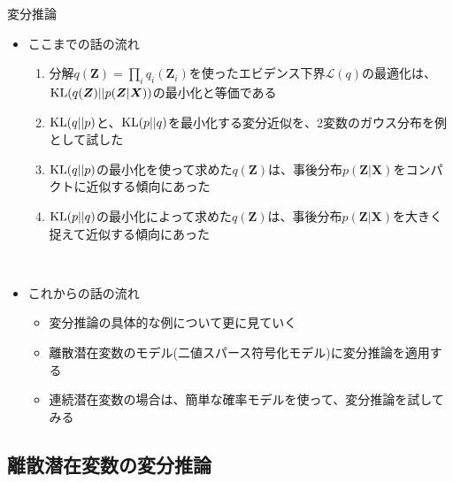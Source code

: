 \documentclass[dvipdfmx,notheorems,t]{beamer}
\begin{document}
\begin{frame}{変分推論}

\begin{itemize}
	\item ここまでの話の流れ
	\begin{enumerate}
		\item 分解$q(\bm{Z}) = \prod_i q_i(\bm{Z}_i)$を使ったエビデンス下界$\mathcal{L}(q)$の最適化は、$\operatorname{KL}(q(\bm{Z}) || p(\bm{Z} | \bm{X}))$の最小化と等価である
		\newline
		\item $\operatorname{KL}(q || p)$と、$\operatorname{KL}(p || q)$を最小化する変分近似を、2変数のガウス分布を例として試した
		\newline
		\item $\operatorname{KL}(q || p)$の最小化を使って求めた$q(\bm{Z})$は、事後分布$p(\bm{Z} | \bm{X})$を\alert{コンパクトに近似}する傾向にあった
		\newline
		\item $\operatorname{KL}(p || q)$の最小化によって求めた$q(\bm{Z})$は、事後分布$p(\bm{Z} | \bm{X})$を\alert{大きく捉えて近似}する傾向にあった
	\end{enumerate} \
	
	\item これからの話の流れ
	\begin{itemize}
		\item 変分推論の具体的な例について更に見ていく
		\item 離散潜在変数のモデル(\alert{二値スパース符号化モデル})に変分推論を適用する
		\item 連続潜在変数の場合は、簡単な確率モデルを使って、変分推論を試してみる
	\end{itemize}
\end{itemize}

\end{frame}

\subsection{離散潜在変数の変分推論}
\end{document}
